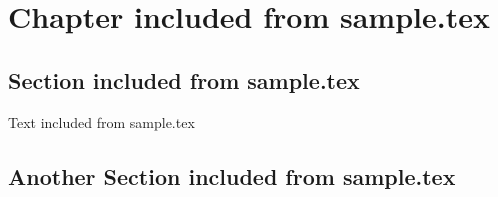 
\chapter{Chapter included from sample.tex}

\section{Section included from sample.tex}

Text included from sample.tex


\newpage


\section{Another Section included from sample.tex}

